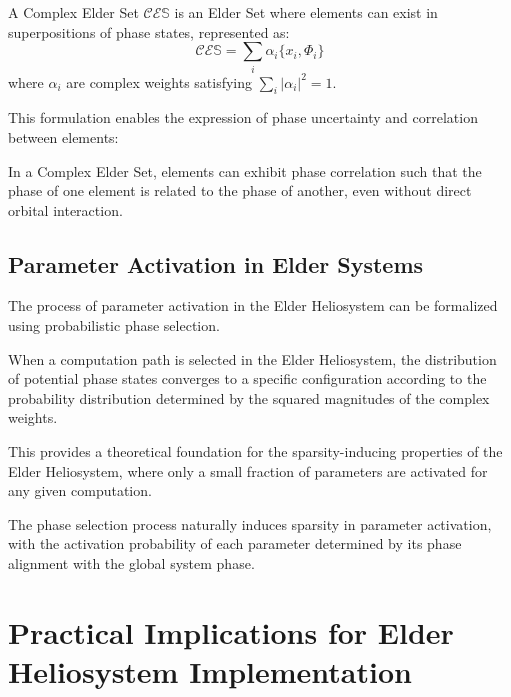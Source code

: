 \begin{definition}
A Complex Elder Set $\mathcal{C}\mathcal{E}\mathbb{S}$ is an Elder Set where elements can exist in superpositions of phase states, represented as:
\begin{equation}
\mathcal{C}\mathcal{E}\mathbb{S} = \sum_i \alpha_i \{x_i, \Phi_i\}
\end{equation}
where $\alpha_i$ are complex weights satisfying $\sum_i |\alpha_i|^2 = 1$.
\end{definition}

This formulation enables the expression of phase uncertainty and correlation between elements:

\begin{theorem}
In a Complex Elder Set, elements can exhibit phase correlation such that the phase of one element is related to the phase of another, even without direct orbital interaction.
\end{theorem}

\subsection{Parameter Activation in Elder Systems}

The process of parameter activation in the Elder Heliosystem can be formalized using probabilistic phase selection.

\begin{definition}
When a computation path is selected in the Elder Heliosystem, the distribution of potential phase states converges to a specific configuration according to the probability distribution determined by the squared magnitudes of the complex weights.
\end{definition}

This provides a theoretical foundation for the sparsity-inducing properties of the Elder Heliosystem, where only a small fraction of parameters are activated for any given computation.

\begin{corollary}
The phase selection process naturally induces sparsity in parameter activation, with the activation probability of each parameter determined by its phase alignment with the global system phase.
\end{corollary}

\section{Practical Implications for Elder Heliosystem Implementation}

